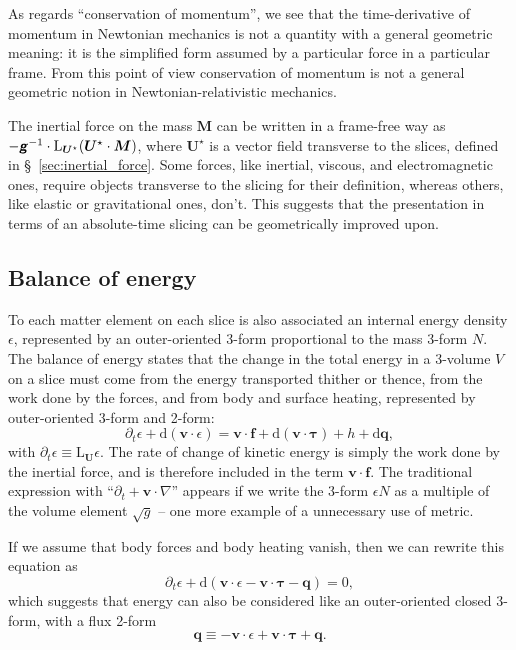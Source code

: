 \documentclass[\ifafour a4paper,12pt,\else a5paper,10pt,\fi%
onecolumn,oneside,article,%
british%
]{memoir}
\theoremstyle{remark}
\theoremstyle{innote}
\newcommand*{\mathte}[1]{\textbf{\textit{\textsf{#1}}}}
\newcommand*{\de}{\partialup}%
\newcommand*{\di}{\mathrm{d}}%
\renewcommand*{\|}[1][]{\nonscript\,#1\vert\nonscript\;\mathopen{}}
\newcommand*{\sect}{\S}%
\newcommand*{\Li}{\mathrm{L}}
\newcommand*{\yd}{N}
\newcommand*{\yrr}{M}
\newcommand*{\yr}{\bm{\yrr}}
\newcommand*{\yQ}{h}
\newcommand*{\yqq}{q}
\newcommand*{\yq}{\bm{\yqq}}
\newcommand*{\yTT}{\tau}
\newcommand*{\yT}{\bm{\yTT}}
\newcommand*{\ybb}{f}
\newcommand*{\yb}{\bm{\ybb}}
\newcommand*{\yvvt}{v}
\newcommand*{\yvt}{\bm{\yvvt}}
\newcommand*{\yFF}{U}
\newcommand*{\yF}{\bm{\yFF}}
\newcommand*{\yFi}{\yF^{\mathord{\star}}}
\newcommand*{\ygg}{g}
\newcommand*{\yg}{\mathte{\ygg}}
\newcommand*{\ygv}{\sqrt{\ygg}}
\newcommand*{\ypp}{q}
\newcommand*{\yp}{\bm{\ypp}}
\newcommand*{\ye}{\epsilon}
\newcommand*{\ynab}{\nabla}
\newcommand*{\yvo}{V}
\begin{document}
As regards \enquote{conservation of momentum}, we see that the
time-derivative of momentum in Newtonian mechanics is not a quantity with a
general geometric meaning: it is the simplified form assumed by a
particular force in a particular frame. From this point of view
conservation of momentum is not a general geometric notion in
Newtonian-relativistic mechanics.




The inertial force on the mass $\yr$ can be written in a frame-free way as
$-\yg^{-1}\cdot \Li_{\yFi}(\yFi\cdot\yr)$, where $\yFi$ is a vector field
transverse to the slices, defined in \sect~\ref{sec:inertial_force}. Some
forces, like inertial, viscous, and electromagnetic ones, require objects
transverse to the slicing for their definition, whereas others, like
elastic or gravitational ones, don't. This suggests that the presentation
in terms of an absolute-time slicing can be geometrically improved upon.


\subsection{Balance of energy}
\label{sec:energy_balance}

To each matter element on each slice is also associated an internal energy
density $\ye$, represented by an outer-oriented 3-form proportional to
the mass 3-form $\yd$. The balance of energy states that the change in the
total energy in a 3-volume $\yvo$ on a slice must come from the energy
transported thither or thence, from the work done by the forces, and from
body and surface heating, represented by outer-oriented 3-form and 2-form:
\begin{equation}
  \label{eq:balance_energy_traditional}
  \de_t\ye + \di(\yvt \cdot \ye) =
  \yvt\cdot\yb + \di(\yvt\cdot \yT)
  +\yQ + \di\yq,
\end{equation}
with $\de_t\ye \equiv \Li_{\yF}\ye$. The rate of change of
kinetic energy is simply the work done by the inertial force, and is
therefore included in the term $\yvt \cdot \yb$. The traditional expression
with \enquote{$\de_t + \yvt\cdot\ynab$} appears if we write the 3-form
$\ye\yd$ as a multiple of the volume element $\ygv$ -- one more example of
a unnecessary use of metric.

If we assume that body forces and body heating vanish, then we can rewrite
this equation as
\begin{equation}
  \label{eq:balance_energy_suggests_3form}
  \de_t\ye + \di(\yvt \cdot \ye -\yvt\cdot\yT - \yq) = 0,
\end{equation}
which suggests that energy can also be considered like an outer-oriented
closed 3-form, with a flux 2-form
\begin{equation}
  \label{eq:energy_4velocity}
  \yp \equiv -\yvt \cdot\ye + \yvt\cdot\yT +\yq.
\end{equation}
\end{document}
